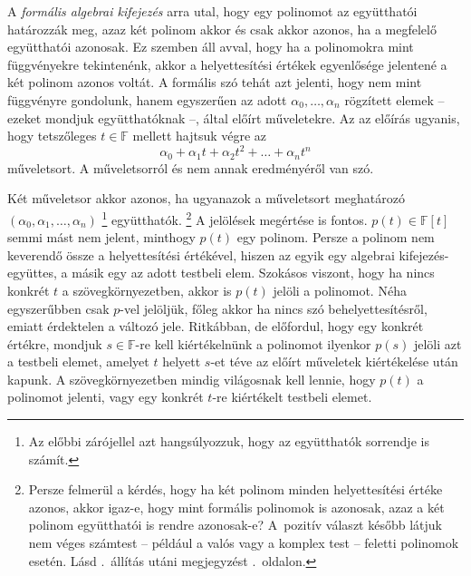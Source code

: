 \documentclass[a4paper, showtrims]{memoir}
\theoremstyle{plain}
\theoremstyle{remark}
\theoremstyle{definition}
\begin{document}
A \emph{formális algebrai kifejezés} arra utal,
hogy egy polinomot az együtthatói határozzák meg,
azaz két polinom akkor és csak akkor azonos,
ha a megfelelő együtthatói azonosak.
Ez szemben áll avval, hogy ha a polinomokra mint függvényekre tekintenénk,
akkor a helyettesítési értékek egyenlősége jelentené a két polinom azonos voltát.
A formális szó tehát azt jelenti, hogy nem mint függvényre gondolunk,
hanem egyszerűen az adott $\alpha_0,\ldots,\alpha_n$ rögzített elemek -- ezeket mondjuk együtthatóknak --,
által előírt műveletekre.
Az az előírás ugyanis, hogy tetszőleges $t\in\mathbb{F}$ mellett hajtsuk végre az
\[
	\alpha_0+\alpha_1t+\alpha_2t^2+\ldots+\alpha_nt^n
\]
műveletsort.
A műveletsorról és nem annak eredményéről van szó.


Két műveletsor akkor azonos, ha ugyanazok a műveletsort meghatározó
$\left( \alpha_0,\alpha_1,\ldots,\alpha_n \right)$%
\footnote{Az előbbi zárójellel azt hangsúlyozzuk, hogy az együtthatók sorrendje is számít.}
együtthatók.%
\footnote{Persze felmerül a kérdés,
	hogy ha két polinom minden helyettesítési értéke azonos,
	akkor igaz-e,
	hogy mint formális polinomok is azonosak,
	azaz a két polinom együtthatói is rendre azonosak-e?
	A~pozitív választ később látjuk nem véges számtest -- például a valós vagy a komplex test -- feletti polinomok esetén.
    Lásd .~állítás utáni megjegyzést \aazt{\pageref{pr:polinomfv}}.~oldalon.%
}
A jelölések megértése is fontos.
$p\left( t \right)\in\mathbb{F}\left[ t \right]$ semmi mást nem jelent,
minthogy $p\left( t \right)$ egy polinom.
Persze a polinom nem keverendő össze a helyettesítési értékével,
hiszen az egyik egy algebrai kifejezés-együttes, a másik egy az adott testbeli elem.
Szokásos viszont, hogy ha nincs konkrét $t$ a szövegkörnyezetben, akkor is $p\left( t \right)$ jelöli a polinomot.
Néha egyszerűbben csak $p$-vel jelöljük, főleg akkor ha nincs szó behelyettesítésről,
emiatt érdektelen a változó jele.
Ritkábban, de előfordul, hogy egy konkrét értékre, mondjuk $s\in\mathbb{F}$-re kell kiértékelnünk a polinomot ilyenkor $p\left( s \right)$ jelöli azt a testbeli elemet,
amelyet $t$ helyett $s$-et téve az előírt műveletek kiértékelése után kapunk.
A szövegkörnyezetben mindig világosnak kell lennie, hogy $p\left( t \right)$ a polinomot jelenti,
vagy egy konkrét $t$-re kiértékelt testbeli elemet.
\end{document}
